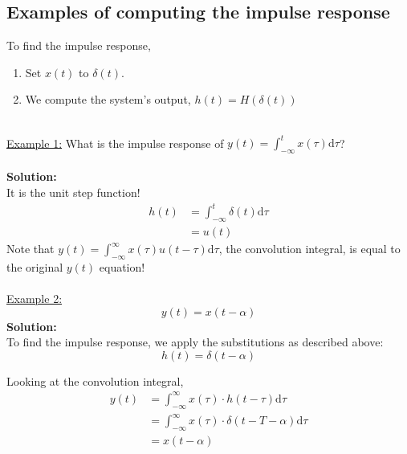 \documentclass[10pt]{article}
\newcommand{\solution}{\textbf{Solution:}}
\begin{document}
\subsection*{Examples of computing the impulse response}
To find the impulse response,
\begin{enumerate}
    \item Set $x(t)$ to $\delta(t)$.
    \item We compute the system's output, $h(t) = H(\delta(t))$
\end{enumerate}
~\\
\underline{Example 1:}
What is the impulse response of $y(t) = \int_{-\infty}^t x(\tau) \text{d}\tau$?\\\\
\solution\\
It is the unit step function!
\begin{align*}
    h(t) &= \int_{-\infty}^t \delta(t) \text{d}\tau\\
    &= u(t)
\end{align*}
Note that $y(t) = \int_{-\infty}^\infty x(\tau) u(t - \tau) \text{d}\tau$, the convolution integral, is equal to the original $y(t)$ equation!\\\\
\underline{Example 2:}
\[y(t) = x(t - \alpha)\]
\solution\\
To find the impulse response, we apply the substitutions as described above:
\[h(t) = \delta(t - \alpha)\]

Looking at the convolution integral,
\begin{align*}
    y(t) &= \int_{-\infty}^\infty x(\tau) \cdot h(t - \tau) \text{d}\tau\\
    &= \int_{-\infty}^\infty x(\tau) \cdot \delta(t - T - \alpha) \text{d}\tau\\
    &= x(t - \alpha)
\end{align*}
\end{document}
